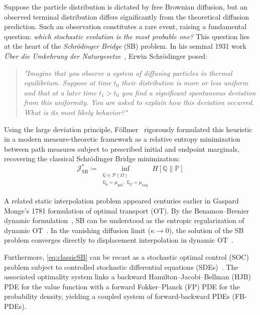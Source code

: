 \documentclass[10pt,a4paper]{article}
\begin{document}
Suppose the particle distribution is dictated by free Brownian diffusion, but an observed terminal distribution differs significantly from the theoretical diffusion prediction. Such an observation constitutes a rare event, raising a fundamental question: \textit{which stochastic evolution is the most probable one?} This question lies at the heart of the \textit{Schrödinger Bridge} (SB) problem. In his seminal 1931 work \textit{Über die Umkehrung der Naturgesetze}~\cite{Schrodinger1931Umkehrung}, Erwin Schrödinger posed:
\vspace{0.4cm}
\begin{quote}
\small \textit{
"Imagine that you observe a system of diffusing particles in thermal
equilibrium. Suppose at time $t_0$ their distribution is more or less
uniform and that at a later time $t_1>t_0$ you find a significant
spontaneous deviation from this uniformity. You are asked to explain how
this deviation occurred. What is its most likely behavior?"
}
\end{quote}
\vspace{0.4cm}
Using the large deviation principle, Föllmer~\cite{histFollmer1988} rigorously formulated this heuristic in a modern measure-theoretic framework as a relative entropy minimization between path measures subject to prescribed initial and endpoint marginals, recovering the classical Schrödinger Bridge minimization:
\begin{equation} \label{eq:classicSB}
    \mathcal{J}_{\text{SB}}^{*} \coloneq \inf_{\substack{\mathbb{Q} \in \mathscr{P}(\Omega) \\ \mathbb{Q}_0 = \mu_{\text{init}}, \; \mathbb{Q}_T = \mu_{\text{targ}}}} 
    H[\mathbb{Q} \parallel \mathbb{P}]
\end{equation}

A related static interpolation problem appeared centuries earlier in Gaspard Monge's 1781 formulation of optimal transport (OT). By the Benamou--Brenier dynamic formulation~\cite{benamou_computational_2000}, SB can be understood as the entropic regularization of dynamic OT~\cite{connectLeonard2012, reviewChen2021}. In the vanishing diffusion limit ($\kappa \to 0$), the solution of the SB problem converges directly to displacement interpolation in dynamic OT~\cite{Mikami2004, Kato2026}.

Furthermore, \eqref{eq:classicSB} can be recast as a stochastic optimal control (SOC) problem subject to controlled stochastic differential equations (SDEs)~\cite{PavonWakolbinger1991, reviewChen2021, reviewLeonard2014}. The associated optimality system links a backward Hamilton--Jacobi--Bellman (HJB) PDE for the value function with a forward Fokker--Planck (FP) PDE for the probability density, yielding a coupled system of forward-backward PDEs (FB-PDEs).
\end{document}
